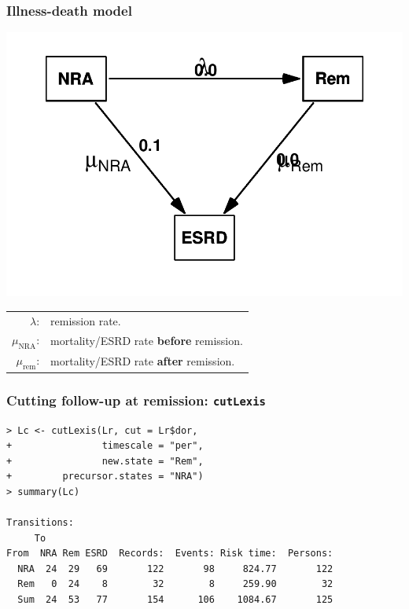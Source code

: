 \begin{frame}
   \frametitle{Illness-death model}
\begin{center}
\includegraphics[height=0.6\textheight,keepaspectratio]{./NRA-death-par3}
\end{center}
\vspace*{-2em}
\begin{tabular}{rl}
$\lambda$: & remission rate.\\
$\mu_\text{NRA}$: & mortality/ESRD rate \textbf{before} remission.\\
$\mu_\text{rem}$: & mortality/ESRD rate \textbf{after} remission.
\end{tabular}
\end{frame}

\begin{frame}[fragile]
  \frametitle{Cutting follow-up at remission: \texttt{cutLexis}}
\renewcommand{\baselinestretch}{0.8}
\footnotesize
\begin{verbatim}
> Lc <- cutLexis(Lr, cut = Lr$dor,
+                timescale = "per",
+                new.state = "Rem",
+         precursor.states = "NRA")
> summary(Lc)

Transitions:
     To
From  NRA Rem ESRD  Records:  Events: Risk time:  Persons:
  NRA  24  29   69       122       98     824.77       122
  Rem   0  24    8        32        8     259.90        32
  Sum  24  53   77       154      106    1084.67       125
\end{verbatim}
\normalsize
\renewcommand{\baselinestretch}{1.0}
\end{frame}

